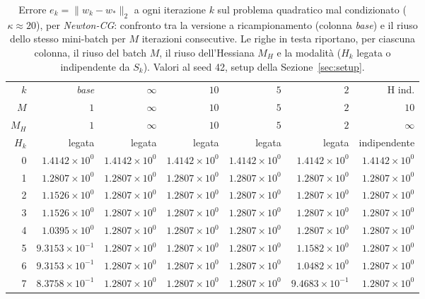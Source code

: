 \begin{table}[H]
\centering
\footnotesize
\renewcommand{\arraystretch}{0.85}
\setlength{\tabcolsep}{2pt}
\caption{Errore $e_k=\|w_k-w_*\|_2$ a ogni iterazione $k$ sul problema quadratico mal condizionato ($\kappa\approx 20$), per \emph{Newton-CG}: confronto tra la versione a ricampionamento (colonna \emph{base}) e il riuso dello stesso mini-batch per $M$ iterazioni consecutive. Le righe in testa riportano, per ciascuna colonna, il riuso del batch $M$, il riuso dell'Hessiana $M_H$ e la modalità ($H_k$ legata o indipendente da $S_k$). Valori al seed 42, setup della Sezione~\ref{sec:setup}.}
\label{tab:riuso_malcond_ncg}
\begin{tabular}{@{}rrrrrrr@{}}
\toprule
$k$ & \emph{base} & $\infty$ & $10$ & $5$ & $2$ & H ind.\\
$M$ & $1$ & $\infty$ & $10$ & $5$ & $2$ & $10$\\
$M_H$ & $1$ & $\infty$ & $10$ & $5$ & $2$ & $\infty$\\
$H_k$ & legata & legata & legata & legata & legata & indipendente\\
\midrule
0 & $1.4142\times10^{0}$ & $1.4142\times10^{0}$ & $1.4142\times10^{0}$ & $1.4142\times10^{0}$ & $1.4142\times10^{0}$ & $1.4142\times10^{0}$\\
1 & $1.2807\times10^{0}$ & $1.2807\times10^{0}$ & $1.2807\times10^{0}$ & $1.2807\times10^{0}$ & $1.2807\times10^{0}$ & $1.2807\times10^{0}$\\
2 & $1.1526\times10^{0}$ & $1.2807\times10^{0}$ & $1.2807\times10^{0}$ & $1.2807\times10^{0}$ & $1.2807\times10^{0}$ & $1.2807\times10^{0}$\\
3 & $1.1526\times10^{0}$ & $1.2807\times10^{0}$ & $1.2807\times10^{0}$ & $1.2807\times10^{0}$ & $1.2807\times10^{0}$ & $1.2807\times10^{0}$\\
4 & $1.0395\times10^{0}$ & $1.2807\times10^{0}$ & $1.2807\times10^{0}$ & $1.2807\times10^{0}$ & $1.2807\times10^{0}$ & $1.2807\times10^{0}$\\
5 & $9.3153\times10^{-1}$ & $1.2807\times10^{0}$ & $1.2807\times10^{0}$ & $1.2807\times10^{0}$ & $1.1582\times10^{0}$ & $1.2807\times10^{0}$\\
6 & $9.3153\times10^{-1}$ & $1.2807\times10^{0}$ & $1.2807\times10^{0}$ & $1.2807\times10^{0}$ & $1.0482\times10^{0}$ & $1.2807\times10^{0}$\\
7 & $8.3758\times10^{-1}$ & $1.2807\times10^{0}$ & $1.2807\times10^{0}$ & $1.2807\times10^{0}$ & $9.4683\times10^{-1}$ & $1.2807\times10^{0}$\\

\end{tabular}
\end{table}
